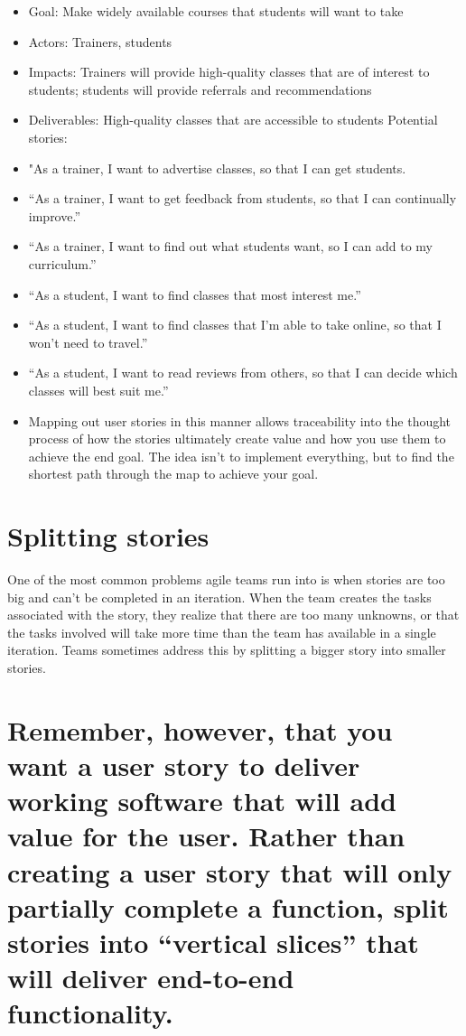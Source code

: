 \begin{itemize}
    \item Goal: Make widely available courses that students will want to take
    \item Actors: Trainers, students
    \item Impacts: Trainers will provide high-quality classes that are of interest to students; students will provide referrals and recommendations
    \item Deliverables: High-quality classes that are accessible to students
Potential stories:
    \item "As a trainer, I want to advertise classes, so that I can get students.
    \item “As a trainer, I want to get feedback from students, so that I can continually improve.”
    \item “As a trainer, I want to find out what students want, so I can add to my curriculum.”
    \item “As a student, I want to find classes that most interest me.”
    \item “As a student, I want to find classes that I’m able to take online, so that I won’t need to travel.”
    \item “As a student, I want to read reviews from others, so that I can decide which classes will best suit me.”
    \item Mapping out user stories in this manner allows traceability into the thought process of how the stories ultimately create value and how you use them to achieve the end goal. The idea isn't to implement everything, but to find the shortest path through the map to achieve your goal.
\end{itemize}

\section{Splitting stories}
One of the most common problems agile teams run into is when stories are too big and can't be completed in an iteration. When the team creates the tasks associated with the story, they realize that there are too many unknowns, or that the tasks involved will take more time than the team has available in a single iteration. Teams sometimes address this by splitting a bigger story into smaller stories.

\section{Remember, however, that you want a user story to deliver working software that will add value for the user. Rather than creating a user story that will only partially complete a function, split stories into “vertical slices” that will deliver end-to-end functionality.}

